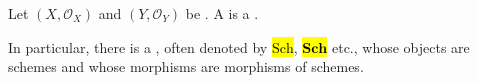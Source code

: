 \begin{definition} \label{definition:morphism_of_schemes}
    Let $(X, \mathcal{O}_X)$ and $(Y, \mathcal{O}_Y)$ be .  
    A  is a .

    In particular, there is a , often denoted by \hl{$\mathrm{Sch}$}, \hl{$\mathbf{Sch}$} etc., whose objects are schemes and whose morphisms are morphisms of schemes.
\end{definition}
